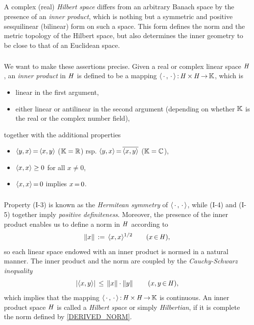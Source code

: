 \documentclass[11pt,twoside]{article}
\begin{document}
\subsection{} %
A complex (real) \textit{Hilbert space} differs
from an arbitrary Banach space by the presence of an \textit{inner product},
which is nothing but a symmetric and positive sesquilinear (bilinear) form
on such a space.
This form defines the norm and the metric topology of the Hilbert space,
but also determines the inner geometry to be close
to that of an Euclidean space.

\subparagraph{} %
We want to make these assertions precise.
Given a real or complex linear space $\mathit{H}$,
an \textit{inner product} in $\mathit{H}$ is defined to be a mapping
$\langle \,\cdot\,,\,\cdot\, \rangle {\,:\,} \mathit{H} {\,\times\,} \mathit{H} {\,\to\,} {\mathbb{K}}$,
which is

\begin{itemize}[leftmargin=35pt]
\item[(I-1)]
linear in the first argument,

\item[(I-2)]
either linear or antilinear in the second argument
(depending on whether ${\mathbb{K}}$ is the real or the complex number field),
\end{itemize}
together with the additional properties

\begin{itemize}[leftmargin=35pt]
\item[(I-3)]
$\langle y,x \rangle {\,=\,}           \langle x,y \rangle$  (${\mathbb{K}}={\mathbb{R}}$) rsp.
$\langle y,x \rangle {\,=\,} \overline{\langle x,y \rangle}$ (${\mathbb{K}}={\mathbb{C}}$),
\item[(I-4)]
$\langle x,x \rangle \geq 0$ for all $x \neq 0$,
\item[(I-5)]
$\langle x,x \rangle {\,=\,} 0$ implies $x {\,=\,} 0$.
\end{itemize}

\subparagraph{}
Property (I-3) is known as the \textit{Hermitean symmetry}
of $\langle \,\cdot\,,\,\cdot\, \rangle$,
while (I-4) and (I-5) together imply \textit{positive definiteness}.
Moreover,
the presence of the inner product enables us to define a norm in $\mathit{H}$
according to
\begin{equation}\label{DERIVED_NORM}
\left\lVert x \right\rVert \,:=\, \langle x,x \rangle ^{1/2} \quad \quad (x {\,\in\,} \mathit{H}),
\end{equation}
so each linear space endowed with an inner product is normed
in a natural manner.
The inner product and the norm are coupled by
the \textit{Cauchy-Schwarz} \textit{inequality}
\[
\abs{\scalar{x}{y}} \, \leq \, \norm{x} \cdot \norm{y}
\quad \quad (x,y \xeof \hilH),
\]
which implies that the mapping
$\langle \,\cdot\,,\,\cdot\, \rangle{\,:\,}\mathit{H} {\,\times\,} \mathit{H} {\,\to\,} {\mathbb{K}}$ is continuous.
An inner product space $\mathit{H}$ is called a \textit{Hilbert space}
or simply \textit{Hilbertian},
if it is complete {\wrt} the norm defined by \eqref{DERIVED_NORM}.
\end{document}
